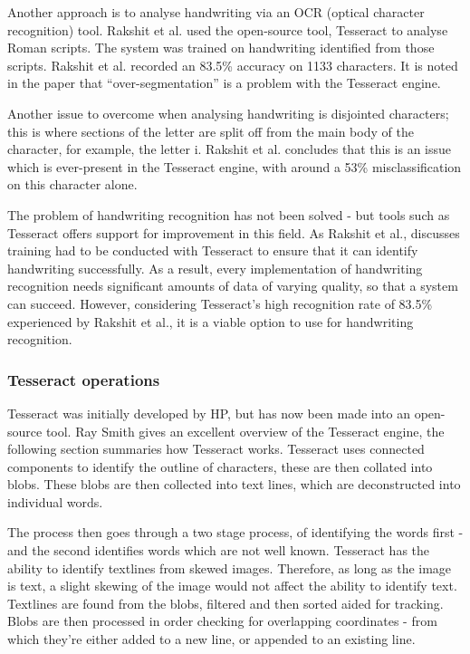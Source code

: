 Another approach is to analyse handwriting via an OCR (optical character recognition) tool. Rakshit et al. \cite{citeulike:13920972} used the open-source tool, Tesseract \cite{citeulike:14014368} to analyse Roman scripts. The system was trained on handwriting identified from those scripts. Rakshit et al. recorded an 83.5\% accuracy on 1133 characters. It is noted in the paper that ``over-segmentation'' is a problem with the Tesseract engine.

Another issue to overcome when analysing handwriting is disjointed characters; this is where sections of the letter are split off from the main body of the character, for example, the letter i. Rakshit et al. concludes that this is an issue which is ever-present in the Tesseract engine, with around a 53\% misclassification on this character alone.

The problem of handwriting recognition has not been solved - but tools such as Tesseract offers support for improvement in this field. As Rakshit et al., discusses training had to be conducted with Tesseract to ensure that it can identify handwriting successfully. As a result, every implementation of handwriting recognition needs significant amounts of data of varying quality, so that a system can succeed. However, considering Tesseract's high recognition rate of 83.5\% experienced by Rakshit et al., it is a viable option to use for handwriting recognition.

\subsubsection{Tesseract operations}
Tesseract was initially developed by HP, but has now been made into an open-source tool. Ray Smith gives an excellent overview of the Tesseract engine, the following section summaries how Tesseract works. Tesseract uses connected components to identify the outline of characters, these are then collated into blobs. These blobs are then collected into text lines, which are deconstructed into individual words.

The process then goes through a two stage process, of identifying the words first - and the second identifies words which are not well known. Tesseract has the ability to identify textlines from skewed images. Therefore, as long as the image is text, a slight skewing of the image would not affect the ability to identify text. Textlines are found from the blobs, filtered and then sorted aided for tracking. Blobs are then processed in order checking for overlapping coordinates - from which they're either added to a new line, or appended to an existing line.

